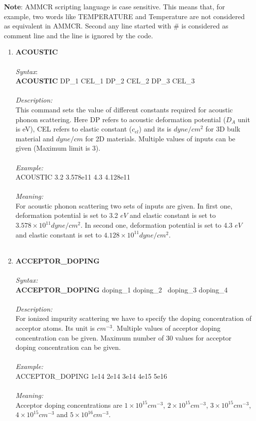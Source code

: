 \documentclass[12pt]{article}
\begin{document}
\textbf{Note}: AMMCR scripting language is case sensitive. This means that, for example, two words like TEMPERATURE and Temperature are not considered as equivalent in AMMCR.
Second any line started with \# is considered as comment line and the line is ignored by the code.

\begin{enumerate}
    \item \textbf{ACOUSTIC} \\ \\
    \textit{Syntax}: \\
    \textbf{ACOUSTIC} DP\_1 CEL\_1 DP\_2 CEL\_2 DP\_3 CEL\_3  \\ \\
    \textit{Description:} \\
    This command sets the value of different constants required for acoustic phonon scattering. Here DP refers to acoustic deformation potential ($D_A$ unit is eV), CEL refers to elastic constant ($c_{el}$) and its is $dyne/cm^2$ for 3D bulk material and $dyne/cm$ for 2D materials. Multiple values of inputs can be given (Maximum limit is 3). \\ \\ 
    \textit{Example:}\\
    ACOUSTIC 3.2 3.578e11 4.3 4.128e11 \\ \\
    \textit{Meaning:}\\
    For acoustic phonon scattering two sets of inputs are given. In first one, deformation potential is set to 3.2 $eV$ and elastic constant is set to $3.578 \times 10^{11} dyne/cm^2 $. In second one, deformation potential is set to 4.3 $eV$ and elastic constant is set to $4.128 \times 10^{11} dyne/cm^2 $. \\ \\
    
    \item \textbf{ACCEPTOR\_DOPING}\\ \\
    \textit{Syntax:} \\
    \textbf{ACCEPTOR\_DOPING} doping\_1 doping\_2 \ doping\_3 doping\_4 \\ \\
    \textit{Description:} \\
    For ionized impurity scattering we have to specify the doping concentration of acceptor atoms. Its unit is $cm^{-3}$. Multiple values of acceptor doping concentration can be given. Maximum number of 30 values for acceptor doping concentration can be given. \\ \\
    \textit{Example:} \\
    ACCEPTOR\_DOPING 1e14 2e14 3e14 4e15 5e16 \\ \\
    \textit{Meaning:} \\ 
    Acceptor doping concentrations are $1 \times 10^{15} cm^{-3}$, $2 \times 10^{15} cm^{-3}$, $3 \times 10^{15} cm^{-3}$, $4 \times 10^{15} cm^{-3}$ and $5 \times 10^{16} cm^{-3}$. \\ \\


\end{enumerate}
\end{document}
